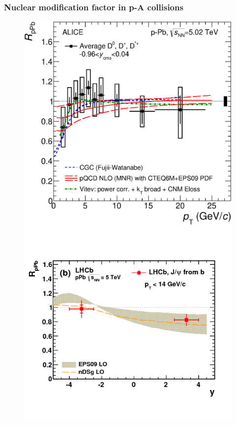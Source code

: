\documentclass[b5paper,10pt,twoside,oldstyle,classica]{toptesi}
\begin{document}
\subsubsection{Nuclear modification factor in p-A collisions}
\label{RpPb_sec}
\begin{figure}[tb]
\begin{center}
\includegraphics[scale = 0.3]{pPbWithModels.eps}
\hspace{0.cm}
{\includegraphics[scale = 0.3]{nonpromptJpsi_RpPb_LHCb.png}}

\end{center}
\end{figure}
\end{document}
